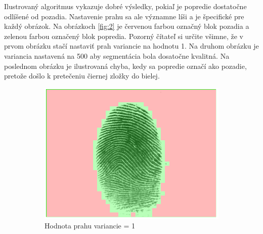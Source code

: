 \documentclass[11pt,a4paper]{article}
\begin{document}
Ilustrovaný algoritmus vykazuje dobré výsledky, pokiaľ je popredie dostatočne odlíšené od pozadia. Nastavenie prahu sa ale významne líši a je špecifické pre každý obrázok. Na obrázkoch \ref{fig:2} je červenou farbou označný blok pozadia a zelenou farbou označený blok popredia. Pozorný čítateľ si určite všimne, že v prvom obrázku stačí nastaviť prah variancie na hodnotu 1. Na druhom obrázku je variancia nastavená na 500 aby segmentácia bola dosatočne kvalitná. Na poslednom obrázku je ilustrovaná chyba, kedy sa popredie označí ako pozadie, pretože došlo k pretečeniu čiernej zložky do bielej.

\begin{figure}[h!]
	\centering
	\begin{subfigure}{0.33\textwidth}
		\centering
		\includegraphics[width=.95\linewidth]{images/Screenshot_5}
		\caption{Hodnota prahu variancie = 1}
		\label{fig:gull}
	\end{subfigure}%
	\begin{subfigure}{0.33\textwidth}
		\centering

\end{subfigure}
\end{figure}
\end{document}
